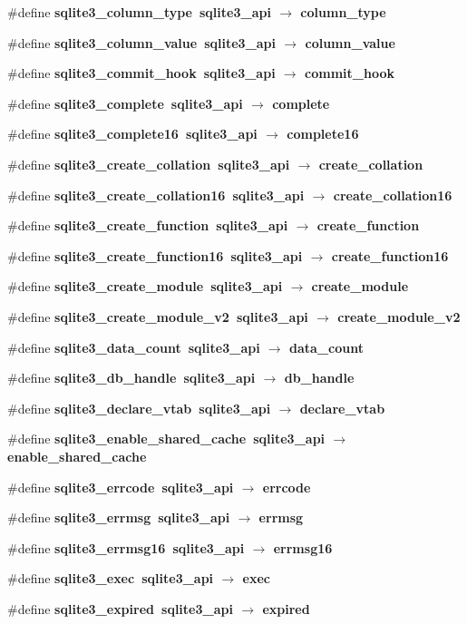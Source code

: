 \begin{CompactItemize}
\item 
\#define \bf{sqlite3\_\-column\_\-type}~sqlite3\_\-api $\rightarrow$ column\_\-type
\item 
\#define \bf{sqlite3\_\-column\_\-value}~sqlite3\_\-api $\rightarrow$ column\_\-value
\item 
\#define \bf{sqlite3\_\-commit\_\-hook}~sqlite3\_\-api $\rightarrow$ commit\_\-hook
\item 
\#define \bf{sqlite3\_\-complete}~sqlite3\_\-api $\rightarrow$ complete
\item 
\#define \bf{sqlite3\_\-complete16}~sqlite3\_\-api $\rightarrow$ complete16
\item 
\#define \bf{sqlite3\_\-create\_\-collation}~sqlite3\_\-api $\rightarrow$ create\_\-collation
\item 
\#define \bf{sqlite3\_\-create\_\-collation16}~sqlite3\_\-api $\rightarrow$ create\_\-collation16
\item 
\#define \bf{sqlite3\_\-create\_\-function}~sqlite3\_\-api $\rightarrow$ create\_\-function
\item 
\#define \bf{sqlite3\_\-create\_\-function16}~sqlite3\_\-api $\rightarrow$ create\_\-function16
\item 
\#define \bf{sqlite3\_\-create\_\-module}~sqlite3\_\-api $\rightarrow$ create\_\-module
\item 
\#define \bf{sqlite3\_\-create\_\-module\_\-v2}~sqlite3\_\-api $\rightarrow$ create\_\-module\_\-v2
\item 
\#define \bf{sqlite3\_\-data\_\-count}~sqlite3\_\-api $\rightarrow$ data\_\-count
\item 
\#define \bf{sqlite3\_\-db\_\-handle}~sqlite3\_\-api $\rightarrow$ db\_\-handle
\item 
\#define \bf{sqlite3\_\-declare\_\-vtab}~sqlite3\_\-api $\rightarrow$ declare\_\-vtab
\item 
\#define \bf{sqlite3\_\-enable\_\-shared\_\-cache}~sqlite3\_\-api $\rightarrow$ enable\_\-shared\_\-cache
\item 
\#define \bf{sqlite3\_\-errcode}~sqlite3\_\-api $\rightarrow$ errcode
\item 
\#define \bf{sqlite3\_\-errmsg}~sqlite3\_\-api $\rightarrow$ errmsg
\item 
\#define \bf{sqlite3\_\-errmsg16}~sqlite3\_\-api $\rightarrow$ errmsg16
\item 
\#define \bf{sqlite3\_\-exec}~sqlite3\_\-api $\rightarrow$ exec
\item 
\#define \bf{sqlite3\_\-expired}~sqlite3\_\-api $\rightarrow$ expired

\end{CompactItemize}
